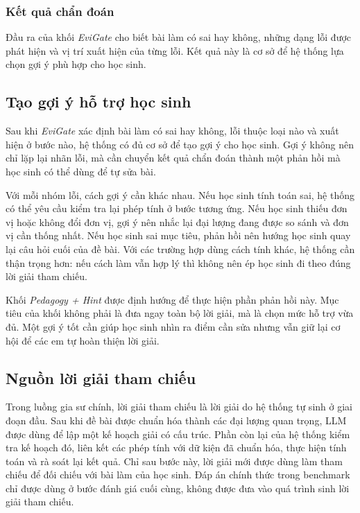 \documentclass[12pt,a4paper]{article}
\begin{document}
\subsubsection{Kết quả chẩn đoán}

Đầu ra của khối \textit{EviGate} cho biết bài làm có sai hay không, những dạng
lỗi được phát hiện và vị trí xuất hiện của từng lỗi. Kết quả này là cơ sở để hệ
thống lựa chọn gợi ý phù hợp cho học sinh.

\subsection{Tạo gợi ý hỗ trợ học sinh}

Sau khi \textit{EviGate} xác định bài làm có sai hay không, lỗi thuộc loại nào
và xuất hiện ở bước nào, hệ thống có đủ cơ sở để tạo gợi ý cho học sinh. Gợi ý
không nên chỉ lặp lại nhãn lỗi, mà cần chuyển kết quả chẩn đoán thành một phản
hồi mà học sinh có thể dùng để tự sửa bài.

Với mỗi nhóm lỗi, cách gợi ý cần khác nhau. Nếu học sinh tính toán sai, hệ thống
có thể yêu cầu kiểm tra lại phép tính ở bước tương ứng. Nếu học sinh thiếu đơn
vị hoặc không đổi đơn vị, gợi ý nên nhắc lại đại lượng đang được so sánh và đơn
vị cần thống nhất. Nếu học sinh sai mục tiêu, phản hồi nên hướng học sinh quay
lại câu hỏi cuối của đề bài. Với các trường hợp dùng cách tính khác, hệ thống
cần thận trọng hơn: nếu cách làm vẫn hợp lý thì không nên ép học sinh đi theo
đúng lời giải tham chiếu.

Khối \textit{Pedagogy + Hint} được định hướng để thực hiện phần phản hồi này.
Mục tiêu của khối không phải là đưa ngay toàn bộ lời giải, mà là chọn mức hỗ trợ
vừa đủ. Một gợi ý tốt cần giúp học sinh nhìn ra điểm cần sửa nhưng vẫn giữ lại
cơ hội để các em tự hoàn thiện lời giải.

\subsection{Nguồn lời giải tham chiếu}

Trong luồng gia sư chính, lời giải tham chiếu là lời giải do hệ thống tự sinh ở
giai đoạn đầu. Sau khi đề bài được chuẩn hóa thành các đại lượng quan trọng, LLM
được dùng để lập một kế hoạch giải có cấu trúc. Phần còn lại của hệ thống kiểm
tra kế hoạch đó, liên kết các phép tính với dữ kiện đã chuẩn hóa, thực hiện tính
toán và rà soát lại kết quả. Chỉ sau bước này, lời giải mới được dùng làm tham
chiếu để đối chiếu với bài làm của học sinh. Đáp án chính thức trong benchmark
chỉ được dùng ở bước đánh giá cuối cùng, không được đưa vào quá trình sinh lời
giải tham chiếu.
\end{document}
